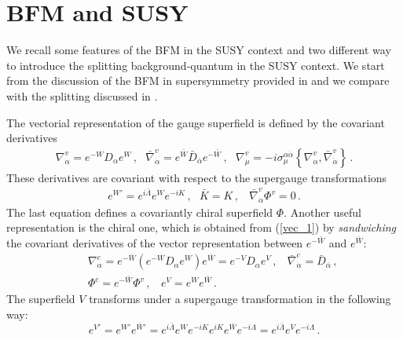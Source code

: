 \documentclass[a4paper,12pt]{article}
\begin{document}


\section{BFM and SUSY}
\label{app:susy_gauge}

We recall some features of the BFM in the SUSY context and two
different way to introduce the splitting background-quantum in the
SUSY context. We start from the discussion of the BFM in supersymmetry
provided in \cite{superspace} and we compare with the splitting
discussed in \cite{3lectures}.

The vectorial representation of the gauge superfield is defined by 
the covariant derivatives
\begin{eqnarray}
  \label{vec_1}
  \nabla^{v}_\alpha = e^{-W} D_\alpha e^W\,,~~~ 
  \bar\nabla^{v}_{\dot\alpha} = e^{\bar W} \bar D_{\bar \alpha}
  e^{-\bar W}\,, ~~~
  \nabla^{v}_\mu = - i \sigma^{\alpha \dot\alpha}_\mu 
  \left\{  \nabla^{v}_\alpha ,   \bar\nabla^v_{\dot\alpha}  \right\}\,.
\end{eqnarray}
These derivatives are covariant with respect to the supergauge
transformations
\begin{eqnarray}
  \label{vec_2}
e^{W'} = e^{i \bar \Lambda} e^W e^{- i K}\,,
~~~  \bar K =K\,,
~~~~ \bar\nabla^v_{\dot \alpha} \Phi^v =0\,.  
\end{eqnarray}
The last equation defines a covariantly chiral superfield $\Phi$.
Another useful representation is the chiral one, which is obtained from
(\ref{vec_1}) by {\it sandwiching} the covariant derivatives of the
vector representation between $e^{-\bar W}$ and $e^{\bar W}$:
\begin{eqnarray}
  \label{ch_1}
&&   \nabla^{c}_\alpha = e^{-\bar W}  \left( e^{-W} D_\alpha e^W \right) 
e^{\bar W} = e^{-V} D_\alpha e^V\,,~~~~  \nonumber 
\bar\nabla^{c}_{\dot\alpha} = \bar D_{\bar \alpha} \,, \\
&&\Phi^{c} = e^{-\bar W} \Phi^v\,, ~~~~ e^V = e^W e^{\bar W}\,.
   \end{eqnarray}
The superfield $V$ transforms under a supergauge transformation
in the following way:
\begin{equation}
  \label{ch_2}
  e^{V'} = e^{W'} e^{\bar W'} = e^{i \bar \Lambda} e^W e^{- i K} e^{ i K}  
e^{\bar W} e^{- i \Lambda} = e^{i \bar \Lambda} e^V e^{- i \Lambda} \,.
\end{equation}
\end{document}
